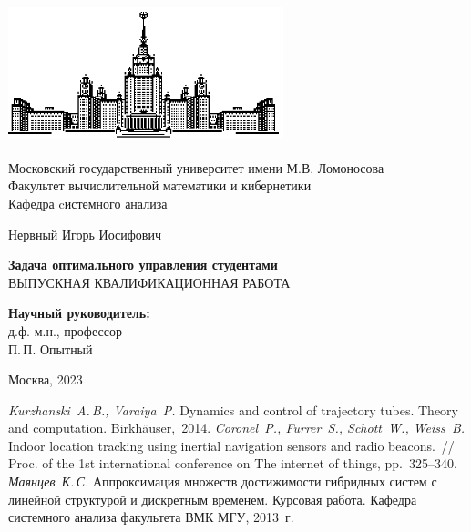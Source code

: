 \documentclass[12pt, a4paper]{article}
\begin{document}
\begin{titlepage}
\begin{center}
\includegraphics[width=8cm, height=4cm]{msu.eps}
\end{center}
\begin{center}
Московский государственный университет имени М.В. Ломоносова\\
\vspace{0.1 cm}
Факультет вычислительной математики и кибернетики\\
\vspace{0.1 cm}
Кафедра cистемного анализа

\vspace{3cm}
{\Large Нервный Игорь Иосифович }\\
\vspace{1cm}

{\bf\LARGE Задача оптимального управления студентами}\\ \vspace{2cm}
ВЫПУСКНАЯ КВАЛИФИКАЦИОННАЯ РАБОТА

\end{center}
\vspace{2cm}
\begin{flushright}

{\bf Научный руководитель:}\\
д.ф.-м.н., профессор\\ 
П.\,П. Опытный

\end{flushright}

 \vspace{4.5cm}

\centerline {Москва, 2023}

\end{titlepage}


\newpage
\begin{thebibliography}{99}
 \textit{Kurzhanski~A.\,B., Varaiya~P.} 
Dynamics and control of trajectory tubes. Theory and computation.  Birkh{\"a}user,~2014.
 \textit{Coronel~P., Furrer~S., Schott~W., Weiss~B.}
 Indoor location tracking using inertial navigation sensors and radio beacons.~\hbox{/\hspace{-0.2em}/}~ Proc. of the 1st international conference on The internet of things, pp.~325--340.
\textit{Маянцев~К.\,С.} Аппроксимация множеств достижимости гибридных систем с линейной структурой и дискретным временем. Курсовая работа. Кафедра системного анализа факультета ВМК МГУ, 2013~г. 
\end{thebibliography}
\end{document}
